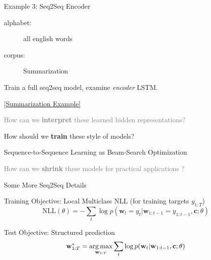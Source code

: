 \documentclass{beamer}
\let\tempone\itemize
\let\temptwo\enditemize
\renewenvironment{itemize}{\tempone\addtolength{\itemsep}{0.5\baselineskip}}{\temptwo}
\newcommand{\air}{\vspace{0.25cm}}
\newcommand{\wvec}{\mathbf{w}}
\newcommand{\cvec}{\mathbf{c}}
\newcommand{\Cite}[1]{{\footnotesize \citep{#1}}}
\def\argmax{\operatornamewithlimits{arg\,max}}
\def\argmax{\operatornamewithlimits{arg\,max}}
\begin{document}
\begin{frame}
  \centerline{\alert{Example 3}: Seq2Seq Encoder}
  \air

  \begin{description}
  \item[alphabet:] all english words
  \item[corpus:]  Summarization
  \end{description}

  \begin{itemize}

  \item Train a full seq2seq model, examine \textit{encoder} LSTM.
  
  \end{itemize}


\air
  \centerline{ \href{http://lstm.seas.harvard.edu/client/pattern_finder.html?data_set=20autoencoder&source=states::states2&pos=100}{[Summarization Example]}}
\end{frame}
\begin{frame}
  \centerline{}
  \air 
  \air

  \begin{itemize}
  \item \textcolor{gray}{How can we \textbf{interpret} these learned hidden representations? \Cite{Strobelt2016}}
    \air 
  \item  How should we \textbf{train} these style of models? 
    \air 

    \begin{center}
      \alert{Sequence-to-Sequence Learning as Beam-Search
        Optimization}

      \Cite{Wiseman2016a}
    \end{center}


    \air 
  \item \textcolor{gray}{ How can we \textbf{shrink} these models for practical applications \Cite{Kim2016a}? }
  \end{itemize}
\end{frame}




\begin{frame}
  \centerline{Some More Seq2Seq \alert{Details} }
  \air 
  \air

  Training Objective: Local Multiclass NLL (for training targets $y_{1:T}$)
  \[ \text{NLL}(\theta) = -\sum_{t} \log p(\wvec_{t} = y_t | \wvec_{1:t-1} = y_{1:t-1}, \cvec; \theta) \] 

  \air

  Test Objective:  Structured prediction
  \[ \wvec^*_{1:T} = \argmax_{\wvec_{1:T}} \sum_{t} \log p(\wvec_{t} | \wvec_{1:t-1}, \cvec; \theta) \] 
\end{frame}
\end{document}
